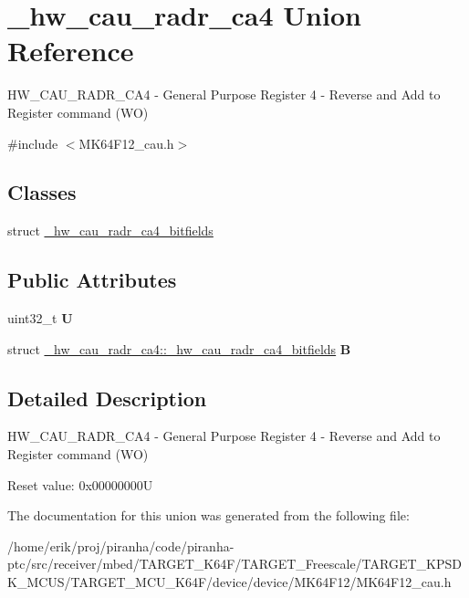 \hypertarget{union__hw__cau__radr__ca4}{}\section{\+\_\+hw\+\_\+cau\+\_\+radr\+\_\+ca4 Union Reference}
\label{union__hw__cau__radr__ca4}


H\+W\+\_\+\+C\+A\+U\+\_\+\+R\+A\+D\+R\+\_\+\+C\+A4 -\/ General Purpose Register 4 -\/ Reverse and Add to Register command (WO)  




{\ttfamily \#include $<$M\+K64\+F12\+\_\+cau.\+h$>$}

\subsection*{Classes}
\begin{DoxyCompactItemize}
\item 
struct \hyperlink{struct__hw__cau__radr__ca4_1_1__hw__cau__radr__ca4__bitfields}{\+\_\+hw\+\_\+cau\+\_\+radr\+\_\+ca4\+\_\+bitfields}
\end{DoxyCompactItemize}
\subsection*{Public Attributes}
\begin{DoxyCompactItemize}
\item 
uint32\+\_\+t {\bfseries U}\hypertarget{union__hw__cau__radr__ca4_ae712bb84144e19540706aeb6d11f8d6b}{}\label{union__hw__cau__radr__ca4_ae712bb84144e19540706aeb6d11f8d6b}

\item 
struct \hyperlink{struct__hw__cau__radr__ca4_1_1__hw__cau__radr__ca4__bitfields}{\+\_\+hw\+\_\+cau\+\_\+radr\+\_\+ca4\+::\+\_\+hw\+\_\+cau\+\_\+radr\+\_\+ca4\+\_\+bitfields} {\bfseries B}\hypertarget{union__hw__cau__radr__ca4_a555a4a50c879dcb3cfa10a30efb4b70e}{}\label{union__hw__cau__radr__ca4_a555a4a50c879dcb3cfa10a30efb4b70e}

\end{DoxyCompactItemize}


\subsection{Detailed Description}
H\+W\+\_\+\+C\+A\+U\+\_\+\+R\+A\+D\+R\+\_\+\+C\+A4 -\/ General Purpose Register 4 -\/ Reverse and Add to Register command (WO) 

Reset value\+: 0x00000000U 

The documentation for this union was generated from the following file\+:\begin{DoxyCompactItemize}
\item 
/home/erik/proj/piranha/code/piranha-\/ptc/src/receiver/mbed/\+T\+A\+R\+G\+E\+T\+\_\+\+K64\+F/\+T\+A\+R\+G\+E\+T\+\_\+\+Freescale/\+T\+A\+R\+G\+E\+T\+\_\+\+K\+P\+S\+D\+K\+\_\+\+M\+C\+U\+S/\+T\+A\+R\+G\+E\+T\+\_\+\+M\+C\+U\+\_\+\+K64\+F/device/device/\+M\+K64\+F12/M\+K64\+F12\+\_\+cau.\+h\end{DoxyCompactItemize}
